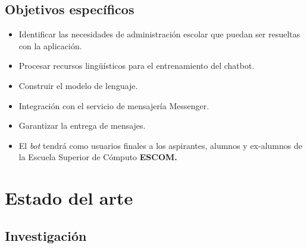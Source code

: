     \subsection{Objetivos específicos}

        \begin{itemize}
            \item Identificar las necesidades de administración escolar que puedan ser resueltas con la aplicación.
            \item Procesar recursos lingüísticos para el entrenamiento del chatbot.
            \item Construir el modelo de lenguaje.
            \item Integración con el servicio de mensajería Messenger.
            \item Garantizar la entrega de mensajes.
            \item El \textit{bot} tendrá como usuarios finales a los aspirantes, alumnos y ex-alumnos de la Escuela Superior de Cómputo \bf{ESCOM}.
        \end{itemize}

\newpage

\section{Estado del arte}

    \subsection{Investigación}

